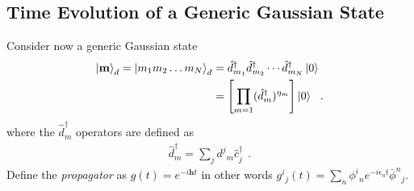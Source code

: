 \documentclass[aps, superscriptaddress, floatfix, onecolumn]{revtex4-2}
\begin{document}
\subsection{Time Evolution of a Generic Gaussian State}

Consider now a generic Gaussian state
\begin{align}
\ket{\mathbf{m}}_d = \ket{m_1 m_2 \ldots m_{N}}_d & = \hat{d}^\dagger_{m_1} \hat{d}^\dagger_{m_2} \cdots \hat{d}^\dagger_{m_{N}} \ket{0} \\
& = \left[ \prod_{m=1} (\hat{d}^\dagger_{m})^{\eta_m} \right] \ket{0} \ \ .
\end{align}
where the $\hat{d}^\dagger_m$ operators are defined as
\begin{align}
\hat{d}^\dagger_m = \sum_j d^j\!_m \hat{c}^\dagger_j \ \ . \label{eq:ddag_c_transform}
\end{align}
Define the \emph{propagator} as $\boxed{g(t) = e^{- i \mathbf{h} t}}$ in other words $\boxed{g^i\!_j(t) = \sum_n \phi^i\!_n e^{-i \epsilon_n t} \bar{\phi}^n\!_j}$.
\end{document}
